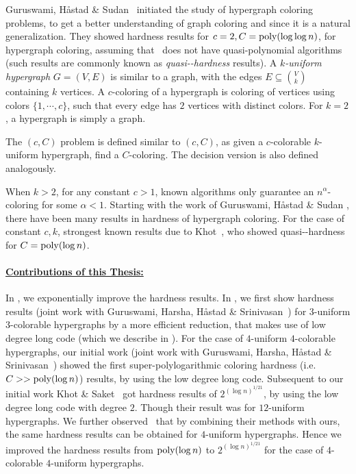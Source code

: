 Guruswami, H\aa stad \& Sudan~\cite{GuruswamiHS2002} initiated
the study of hypergraph coloring problems, to
get a better understanding of graph coloring and since it
is a natural generalization. They showed
hardness results for $c=2, C=\textnormal{poly}(\log \log n)$, for hypergraph coloring, 
assuming
that \NP\ does not have quasi-polynomial algorithms (such
results are commonly known as \emph{quasi-\NP-hardness} results). 
A
\emph{$k$-uniform hypergraph} $G=(V,E)$ is similar to a graph, with the edges
$E\subseteq {V \choose k}$ containing $k$ vertices. A $c$-coloring of a hypergraph is
coloring of vertices using colors $\{1,\cdots, c\}$, such that every edge
has $2$ vertices with distinct colors. For $k=2$,
a hypergraph is simply a graph. 
\begin{definition} 
The $(c,C)$ problem is defined similar to
\ApproximateGraphColoring$(c,C)$, as given a $c$-colorable $k$-uniform
hypergraph, find a $C$-coloring. The decision version is also defined
analogously. 
\end{definition}
When $k>2$, for any constant $c>1$, known algorithms only guarantee an
 $n^\alpha$-coloring for some $\alpha < 1$. Starting
 with the work of Guruswami, H\aa stad \& Sudan \cite{GuruswamiHS2002}, 
 there have been many results in hardness of hypergraph coloring.
 For the case of constant $c,k$, strongest known results 
 due to Khot~\cite{Khot2002c}, who showed 
quasi-\NP-hardness  for $C= \textnormal{poly}( \log n)$.
\noindent
\paragraph{\underline{Contributions of this Thesis:}}
In , we exponentially improve the hardness
results.  In , we first show hardness results (joint work with Guruswami, Harsha, H\aa stad \& 
Srinivasan~\cite{GuruswamiHHSV2014}) for 
$3$-uniform $3$-colorable hypergraphs by a more efficient reduction,
that makes use of low degree long code (which we describe in ).
For the case of $4$-uniform $4$-colorable hypergraphs, 
our initial work (joint work with Guruswami, Harsha, H\aa stad \& 
Srinivasan~\cite{GuruswamiHHSV2014}) showed the first
super-polylogarithmic coloring hardness (i.e. $C >> \textnormal{poly}(\log n)$)  results, by
using the low degree long code. 
Subsequent to our initial work Khot \&
Saket~\cite{KhotS2014b} got hardness results of $2^{(\log
n)^{1/21}}$, by using the low degree long code with degree $2$. Though their result was
for $12$-uniform hypergraphs. We further observed~\cite{Varma2014} that
by combining their methods with ours, the same hardness results can be
obtained for $4$-uniform hypergraphs. Hence  we improved the hardness
results from $\textnormal{poly}(\log n)$ to $2^{(\log n)^{1/21}}$ for
the case of $4$-colorable $4$-uniform hypergraphs. 

